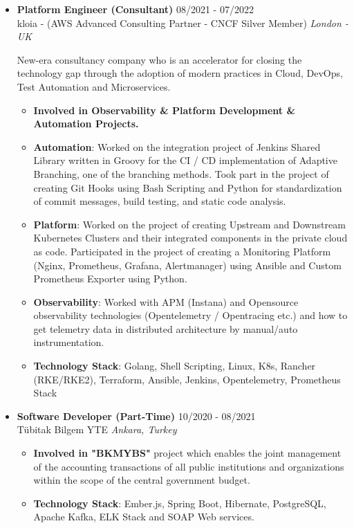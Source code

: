 \documentclass[a4paper,10pt]{article}
\newcommand{\resumeSubheading}[4]{
  \vspace{-2pt}\item
    \textbf{#1} \hfill #2 \\
    {#3} \hfill \textit{#4} \vspace{-5pt}
}
\begin{document}
\begin{itemize}[leftmargin=0.5cm]
    \bigbreak
    \resumeSubheading
        {Platform Engineer (Consultant)}{08/2021 - 07/2022}
        {kloia - (AWS Advanced Consulting Partner - CNCF Silver Member)}{London - UK}
        
        {New-era consultancy company who is an accelerator for closing the technology gap through the adoption of modern practices in Cloud, DevOps, Test Automation and Microservices.}
        \begin{itemize}
            \item \textbf{Involved in Observability \& Platform Development \& Automation Projects.}
            \item \textbf{Automation}: Worked on the integration project of Jenkins Shared Library written in Groovy for the CI / CD implementation of Adaptive Branching, one of the branching methods. Took part in the project of creating Git Hooks using Bash Scripting and Python for standardization of commit messages, build testing, and static code analysis.
            \item \textbf{Platform}: Worked on the project of creating Upstream and Downstream Kubernetes Clusters and their integrated components in the private cloud as code. Participated in the project of creating a Monitoring Platform (Nginx, Prometheus, Grafana, Alertmanager) using Ansible and Custom Prometheus Exporter using Python.
            \item \textbf{Observability}: Worked with APM (Instana) and Opensource observability technologies (Opentelemetry / Opentracing etc.) and how to get telemetry data in distributed architecture by manual/auto instrumentation.
            \item \textbf{Technology Stack}: Golang, Shell Scripting, Linux, K8s, Rancher (RKE/RKE2), Terraform, Ansible, Jenkins, Opentelemetry, Prometheus Stack
        \end{itemize}
    \bigbreak
    \resumeSubheading
        {Software Developer (Part-Time)}{10/2020 - 08/2021}
        {Tübitak Bilgem YTE}{Ankara, Turkey}
        \begin{itemize}
            \item \textbf{Involved in "BKMYBS"} project which enables the joint management of the accounting transactions of all public institutions and organizations within the scope of the central government budget.
            \item \textbf{Technology Stack}: Ember.js, Spring Boot, Hibernate, PostgreSQL, Apache Kafka, ELK Stack and SOAP Web services.
        \end{itemize}
\end{itemize}
\end{document}
